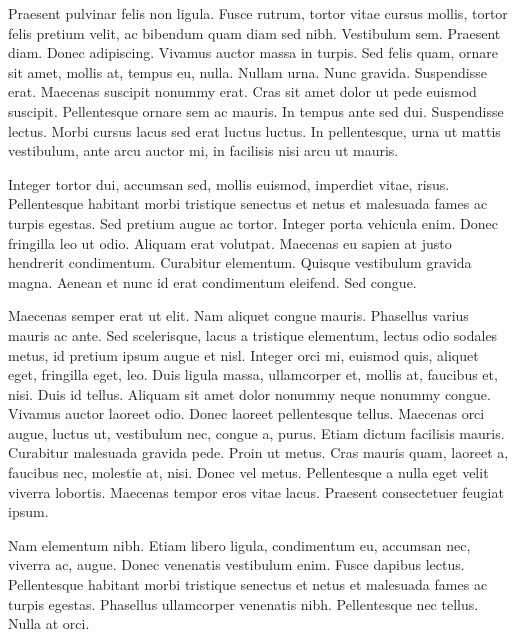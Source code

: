 \documentclass{icldt}
\begin{document}
Praesent pulvinar felis non ligula. Fusce rutrum, tortor vitae cursus mollis,
tortor felis pretium velit, ac bibendum quam diam sed nibh. Vestibulum sem.
Praesent diam. Donec adipiscing. Vivamus auctor massa in turpis. Sed felis quam,
ornare sit amet, mollis at, tempus eu, nulla. Nullam urna. Nunc gravida.
Suspendisse erat. Maecenas suscipit nonummy erat. Cras sit amet dolor ut pede
euismod suscipit. Pellentesque ornare sem ac mauris. In tempus ante sed dui.
Suspendisse lectus. Morbi cursus lacus sed erat luctus luctus. In pellentesque,
urna ut mattis vestibulum, ante arcu auctor mi, in facilisis nisi arcu ut
mauris.

Integer tortor dui, accumsan sed, mollis euismod, imperdiet vitae, risus.
Pellentesque habitant morbi tristique senectus et netus et malesuada fames ac
turpis egestas. Sed pretium augue ac tortor. Integer porta vehicula enim. Donec
fringilla leo ut odio. Aliquam erat volutpat. Maecenas eu sapien at justo
hendrerit condimentum. Curabitur elementum. Quisque vestibulum gravida magna.
Aenean et nunc id erat condimentum eleifend. Sed congue.

Maecenas semper erat ut elit. Nam aliquet congue mauris. Phasellus varius mauris
ac ante. Sed scelerisque, lacus a tristique elementum, lectus odio sodales
metus, id pretium ipsum augue et nisl. Integer orci mi, euismod quis, aliquet
eget, fringilla eget, leo. Duis ligula massa, ullamcorper et, mollis at,
faucibus et, nisi. Duis id tellus. Aliquam sit amet dolor nonummy neque nonummy
congue. Vivamus auctor laoreet odio. Donec laoreet pellentesque tellus. Maecenas
orci augue, luctus ut, vestibulum nec, congue a, purus. Etiam dictum facilisis
mauris. Curabitur malesuada gravida pede. Proin ut metus. Cras mauris quam,
laoreet a, faucibus nec, molestie at, nisi. Donec vel metus. Pellentesque a
nulla eget velit viverra lobortis. Maecenas tempor eros vitae lacus. Praesent
consectetuer feugiat ipsum.

Nam elementum nibh. Etiam libero ligula, condimentum eu, accumsan nec, viverra
ac, augue. Donec venenatis vestibulum enim. Fusce dapibus lectus. Pellentesque
habitant morbi tristique senectus et netus et malesuada fames ac turpis egestas.
Phasellus ullamcorper venenatis nibh. Pellentesque nec tellus. Nulla at orci.
\cite{AlexGroceSep2011}


\nocite{*}
\end{document}

